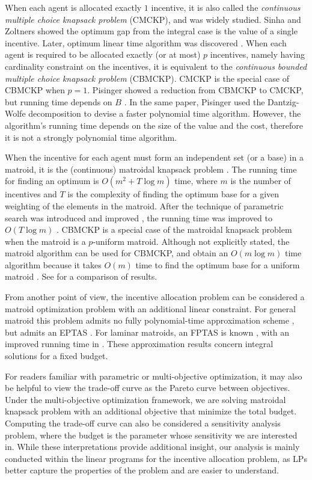 \documentclass{article}
\begin{document}
When each agent is allocated exactly $1$ incentive, it is also called the \emph{continuous multiple choice knapsack problem} (CMCKP), and was widely studied. Sinha and Zoltners \cite{Zoltners} showed the optimum gap from the integral case is the value of a single incentive. Later, optimum linear time algorithm was discovered \cite{Dyer84,ZEMEL1984123}.
When each agent is required to be allocated exactly (or at most) $p$ incentives, namely having cardinality constraint on the incentives, it is equivalent to the \emph{continuous bounded multiple choice knapsack problem} (CBMCKP). CMCKP is the special case of CBMCKP when $p=1$.  Pisinger showed a reduction from CBMCKP to CMCKP, but running time depends on $B$ . In the same paper, Pisinger used the Dantzig-Wolfe decomposition to devise a faster polynomial time algorithm. However, the algorithm's running time depends on the size of the value and the cost, therefore it is not a strongly polynomial time algorithm. 

When the incentive for each agent must form an independent set (or a base) in a matroid, it is the (continuous) matroidal knapsack problem \cite{CAMERINI1984157}. The running time for finding an optimum is $O(m^2+ T\log m)$ time, where $m$ is the number of incentives and $T$ is the complexity of finding the optimum base for a given weighting of the elements in the matroid. After the technique of parametric search was introduced and improved \cite{Megiddo,Cole87}, the running time was improved to $O(T\log m)$ \cite{minimaxoptimization}. CBMCKP is a special case of the matroidal knapsack problem when the matroid is a $p$-uniform matroid. Although not explicitly stated, the matroid algorithm can be used for CBMCKP, and obtain an $O(m\log m)$ time algorithm because it takes $O(m)$ time to find the optimum base for a uniform matroid \cite{minimaxoptimization}. See  for a comparison of results. 

From another point of view, the incentive allocation problem can be considered a matroid optimization problem with an additional linear constraint. For general matroid this problem admits no fully polynomial-time approximation scheme \cite{doronarad_et_al:LIPIcs.ICALP.2024.56}, but admits an EPTAS \cite{DoronAradKulikShachnai2026}. For laminar matroids, an FPTAS is known \cite{DoronAradKulikShachnai2023}, with an improved running time in \cite{YangKovalyovZhang2025}. These approximation results concern integral solutions for a fixed budget.

For readers familiar with parametric or multi-objective optimization, it may also be helpful to view the trade-off curve as the Pareto curve between objectives. Under the multi-objective optimization framework, we are solving matroidal knapsack problem with an additional objective that minimize the total budget. Computing the trade-off curve can also be considered a sensitivity analysis problem, where the budget is the parameter whose sensitivity we are interested in. While these interpretations provide additional insight, our analysis is mainly conducted within the linear programs for the incentive allocation problem, as LPs better capture the properties of the problem and are easier to understand.
\end{document}
